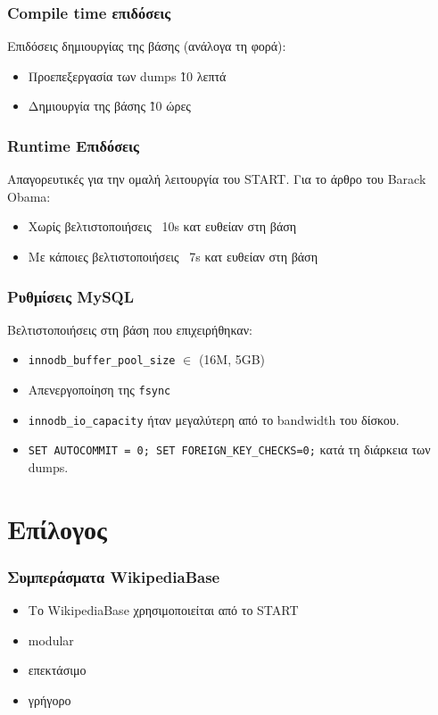 \documentclass[bigger]{beamer}
\begin{document}
\begin{frame}
  \frametitle{Compile time επιδόσεις}
  Επιδόσεις δημιουργίας της βάσης (ανάλογα τη φορά):

  \begin{itemize}
  \item Προεπεξεργασία των dumps \~10 λεπτά
  \item Δημιουργία της βάσης \~10 ώρες
  \end{itemize}
\end{frame}

\begin{frame}
  \frametitle{Runtime Επιδόσεις}

  Απαγορευτικές για την ομαλή λειτουργία του START. Για το άρθρο του
  Barack Obama:
  \begin{itemize}
  \item Χωρίς βελτιστοποιήσεις ~10s κατ ευθείαν στη βάση
  \item Με κάποιες βελτιστοποιήσεις ~7s κατ ευθείαν στη βάση
  \end{itemize}
\end{frame}

\begin{frame}
  \frametitle{Ρυθμίσεις MySQL}

  Βελτιστοποιήσεις στη βάση που επιχειρήθηκαν:

  \begin{itemize}
  \item \texttt{innodb\_buffer\_pool\_size} \(\in\) (16Μ, 5GB)
  \item Απενεργοποίηση της \texttt{fsync}
  \item \texttt{innodb\_io\_capacity} ήταν μεγαλύτερη από το bandwidth
    του δίσκου.
  \item \texttt{SET AUTOCOMMIT = 0; SET FOREIGN\_KEY\_CHECKS=0;} κατά τη
    διάρκεια των dumps.
  \end{itemize}
\end{frame}

\section{Επίλογος}

\begin{frame}
  \frametitle{Συμπεράσματα WikipediaBase}

  \begin{itemize}
  \item Το WikipediaBase χρησιμοποιείται από το START
  \item modular
  \item επεκτάσιμο
  \item γρήγορο
  \end{itemize}
\end{frame}
\end{document}
